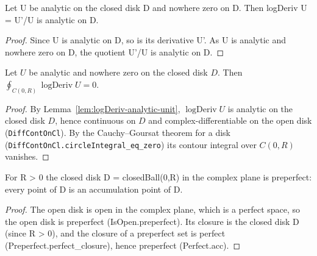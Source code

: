 \begin{lemma}
  \label{lem:logDeriv-analytic-unit}
  \leanok
  Let U be analytic on the closed disk D and nowhere zero on D. Then
  logDeriv U = U'/U is analytic on D.
\end{lemma}
\begin{proof}
  Since U is analytic on D, so is its derivative U'. As U is analytic and
  nowhere zero on D, the quotient U'/U is analytic on D.
\end{proof}

\begin{lemma}
    \label{lem:circleIntegral-logDeriv-unit}
    \leanok
    Let $U$ be analytic and nowhere zero on the closed disk $D$. Then
    $\oint_{C(0,R)} \operatorname{logDeriv} U = 0$.
\end{lemma}
\begin{proof}
    By Lemma~\ref{lem:logDeriv-analytic-unit}, $\operatorname{logDeriv} U$ is
    analytic on the closed disk $D$, hence continuous on $D$ and
    complex-differentiable on the open disk (\texttt{DiffContOnCl}). By the
    Cauchy--Goursat theorem for a disk
    (\texttt{DiffContOnCl.circleIntegral\_eq\_zero}) its contour integral over
    $C(0,R)$ vanishes.
\end{proof}

\begin{lemma}
  \label{lem:closedBall-preperfect}
  \leanok
  For R > 0 the closed disk D = closedBall(0,R) in the complex plane is
  preperfect: every point of D is an accumulation point of D.
\end{lemma}
\begin{proof}
  The open disk is open in the complex plane, which is a perfect space, so the
  open disk is preperfect (IsOpen.preperfect). Its closure is the closed disk D
  (since R > 0), and the closure of a preperfect set is perfect
  (Preperfect.perfect_closure), hence preperfect (Perfect.acc).
\end{proof}

